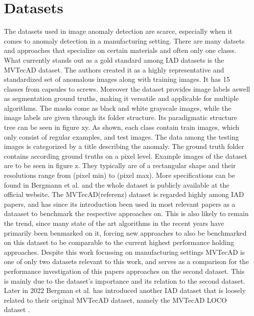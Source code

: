 \section{Datasets}
\label{sec:datasets}
The datasets used in image anomaly detection are scarce, especially when it comes to anomaly detection in a manufacturing setting. There are many datsets and approaches that specialize on certain materials \cite{FabricDataset_Tsang_2016} 
\cite{SteeltubeDataset_Yang_2021} \cite{magnetictiles_Huang_2018}
and often only one classs. What currently stands out as a gold standard among IAD datasets is the MVTecAD \cite{MVTEC_Bergmann_2021} dataset. The authors created it  
as a highly representative and standardized set of anomalous images along with training images. It has 15 classes from capsules to screws. Moreover the dataset provides image labels aswell as segmentation 
ground truths, making it versatile and applicable for multiple algorithms. The masks come as black and white grayscale images, while the image labels are given through its folder structure. 
Its paradigmatic structure tree can be seen in figure xy. As shown, each class contain train images, which only consist of regular examples, 
and test images. The data among the testing images is categorized by a title describing the anomaly. The ground truth folder contains 
according ground truths on a pixel level. Example images of the dataset are to be seen in figure z. They typically are of a rectangular shape and their resolutions range from 
(pixel min) to (pixel max). More specifications can be found in Bergmann et al. \cite{MVTEC_Bergmann_2021} and the whole dataset is publicly available at the official website\cite{mvtecdownload}.\newline
The MVTecAD(referenz) dataset is regarded highly among IAD papers, and has since its introduction been used in most relevant papers as a dataaset 
to benchmark the respective approaches on. This is also likely to remain the trend, since many state of the art algorithms in the recent years have primarily been benmarked on it, forcing new approaches 
to also be benchmarked on this dataset to be comparable to the current highest performance holding approaches. Despite this work focussing on manufacturing settings MVTecAD is one of only two datasets relevant to this work, 
and serves as a comparison for the performance investigation of this papers approaches on the second dataset. This is mainly due to the dataset's importance and 
its relation to the second dataset.
\newline
Later in 2022 Bergman et al. has introduced another IAD dataset that is loosely related to their original MVTecAD dataset, namely the MVTecAD LOCO dataset \cite{LOCODentsAndScratchesBergmann2022}. 
